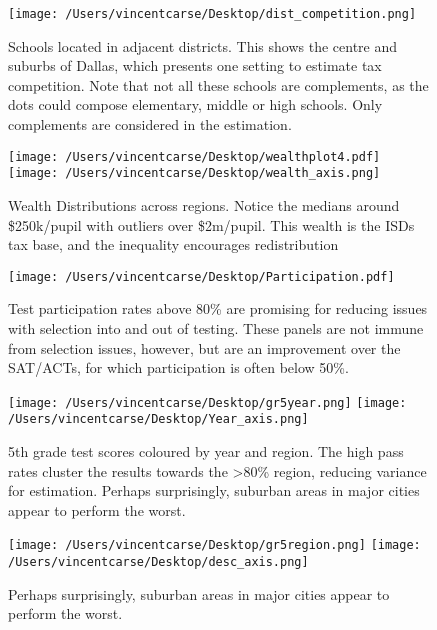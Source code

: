 \documentclass[11pt]{article}
\begin{document}
\begin{figure}
    \label{image-myimage}
    \texttt{[image: /Users/vincentcarse/Desktop/dist\_competition.png]}
    \caption{Schools located in adjacent districts. This shows the centre and suburbs of Dallas, which presents one setting to estimate tax competition. Note that not all these schools are complements, as the dots could compose elementary, middle or high schools. Only complements are considered in the estimation.}
\end{figure}

\begin{figure}
    \label{image-myimage}
    \texttt{[image: /Users/vincentcarse/Desktop/wealthplot4.pdf]}
    \texttt{[image: /Users/vincentcarse/Desktop/wealth\_axis.png]}
    \caption{Wealth Distributions across regions. Notice the medians around \$250k/pupil with outliers over \$2m/pupil. This wealth is the ISDs tax base, and the inequality encourages redistribution}
\end{figure}

\begin{figure}
    \label{image-myimage}
    \texttt{[image: /Users/vincentcarse/Desktop/Participation.pdf]}
    \caption{Test participation rates above 80\% are promising for reducing issues with selection into and out of testing. These panels are not immune from selection issues, however, but are an improvement over the SAT/ACTs, for which participation is often below 50\%.}
\end{figure}

\begin{figure}
    \label{Can I see this label?}
    \texttt{[image: /Users/vincentcarse/Desktop/gr5year.png]}
    \texttt{[image: /Users/vincentcarse/Desktop/Year\_axis.png]}
    \caption{5th grade test scores coloured by year and region. The high pass rates cluster the results towards the \textgreater80\% region, reducing variance for estimation. Perhaps surprisingly, suburban areas in major cities appear to perform the worst.}
\end{figure}

\begin{figure}
    \label{Can I see this label?}
    \texttt{[image: /Users/vincentcarse/Desktop/gr5region.png]}
    \texttt{[image: /Users/vincentcarse/Desktop/desc\_axis.png]}
    \caption{Perhaps surprisingly, suburban areas in major cities appear to perform the worst.}
\end{figure}
\end{document}
